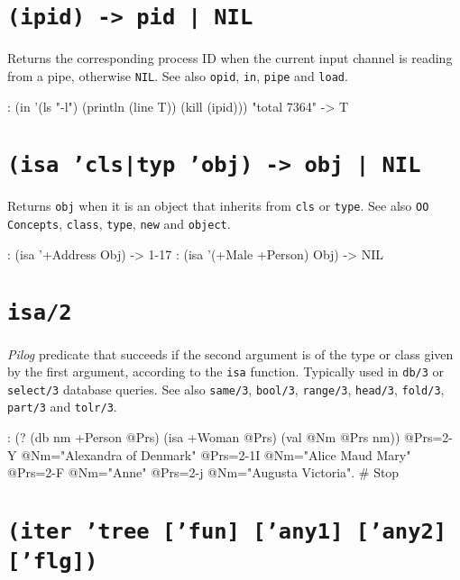 
\section*{\texttt{(ipid) -> pid | NIL}}
\label{sec:func-ref-I-(ipid) -> pid | NIL}


Returns the corresponding process ID when the current input channel is
reading from a pipe, otherwise \texttt{NIL}. See also \texttt{opid}, \texttt{in}, \texttt{pipe} and
\texttt{load}.


\begin{wideverbatim}
: (in '(ls "-l") (println (line T)) (kill (ipid)))
"total 7364"
-> T
\end{wideverbatim}

 
\section*{\texttt{(isa 'cls|typ 'obj) -> obj | NIL}}
\label{sec:func-ref-I-(isa 'cls|typ 'obj) -> obj | NIL}


Returns \texttt{obj} when it is an object that inherits from \texttt{cls} or \texttt{type}.
See also \texttt{OO Concepts}, \texttt{class}, \texttt{type}, \texttt{new} and \texttt{object}.


\begin{wideverbatim}
: (isa '+Address Obj)
-> {1-17}
: (isa '(+Male +Person) Obj)
-> NIL
\end{wideverbatim}

 
\section*{\texttt{isa/2}}
\label{sec:func-ref-I-isa/2}


\emph{Pilog} predicate that succeeds if the second argument
is of the type or class given by the first argument, according to the
\texttt{isa} function. Typically used in \texttt{db/3} or \texttt{select/3} database queries.
See also \texttt{same/3}, \texttt{bool/3}, \texttt{range/3}, \texttt{head/3}, \texttt{fold/3}, \texttt{part/3} and
\texttt{tolr/3}.


\begin{wideverbatim}
: (? (db nm +Person @Prs) (isa +Woman @Prs) (val @Nm @Prs nm))
 @Prs={2-Y} @Nm="Alexandra of Denmark"
 @Prs={2-1I} @Nm="Alice Maud Mary"
 @Prs={2-F} @Nm="Anne"
 @Prs={2-j} @Nm="Augusta Victoria".   # Stop
\end{wideverbatim}

 
\section*{\texttt{(iter 'tree ['fun] ['any1] ['any2] ['flg])}}
\label{sec:func-ref-I-(iter 'tree ['fun] ['any1] ['any2] ['flg])}


